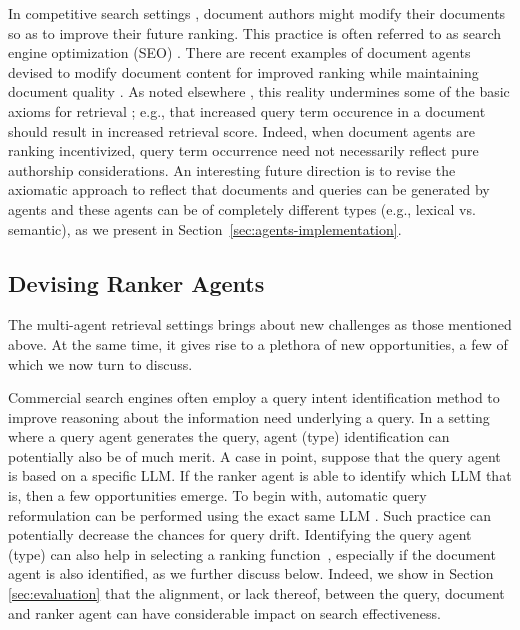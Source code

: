 In competitive search settings \cite{kurland_competitive_2022},
document authors might modify their documents so as to improve their
future ranking. This practice is often referred to as search engine
optimization (SEO) \cite{Gyongyi+Molina:05a}. There are recent
examples of document agents devised to modify document content for
improved ranking while maintaining document quality
\cite{Greg-bot,Niv}. As noted elsewhere
\cite{kurland_competitive_2022}, this reality undermines some of the
basic axioms for retrieval \cite{Fang+Zhai:05a}; e.g., that increased
query term occurence in a document should result in increased
retrieval score. Indeed, when document agents are ranking
incentivized, query term occurrence need not necessarily reflect pure
authorship considerations. An interesting future direction is to
revise the axiomatic approach to reflect that documents and queries can be generated by agents and these agents can be of completely different types (e.g., lexical vs. semantic), as we present in Section~\ref{sec:agents-implementation}.
  
\subsection{Devising Ranker Agents}
\label{sec:devising-ranker-agents}
The multi-agent retrieval settings brings about new challenges as
those mentioned above. At the same time, it gives rise to a plethora
of new opportunities, a few of which we now turn to discuss.

 Commercial search engines often employ a query
intent identification method \cite{Jansen+al:07a} to improve reasoning
about the information need underlying a query. In a setting where a
query agent generates the query, agent (type) identification can
potentially also be of much merit. A case in point, suppose that the query
agent is based on a specific LLM. If the ranker agent is able to
identify which LLM that is, then a few opportunities emerge. To begin
with, automatic query reformulation can be performed using the exact same
LLM \cite{Jagerman+al:23a}. Such practice can potentially decrease the chances for query drift.
Identifying the query agent (type) can also help in selecting a ranking
function~\cite{Balasubramanian+Allan:10a}, especially if the document agent is also identified, as we further discuss below. Indeed, we show in Section \ref{sec:evaluation} that the alignment, or lack thereof, between the query, document and ranker agent can have considerable impact on search effectiveness.


